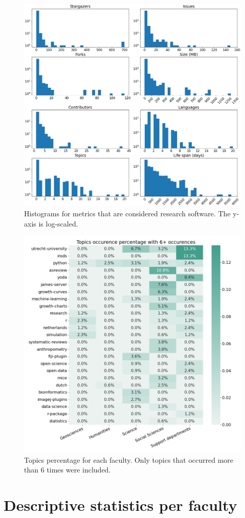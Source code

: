 \begin{figure}[h!]
\centerline{
\includegraphics[scale=0.5]{figures_results/extra/stats_histograms_rs_only.png}}
\caption{Histograms for metrics that are considered research software. The y-axis is log-scaled.
\label{fig:stats_histograms_rs_only}}
\end{figure}


\begin{figure}[h!]
\centerline{
\includegraphics[scale=0.6]{figures_results/extra/heatmap_topics_percentage.png}}
\caption{Topics percentage for each faculty. Only topics that occurred more than 6 times were included.
\label{fig:heatmap_topics_percentage}}
\end{figure}


\chapter{Descriptive statistics per faculty}
\label{app:stats_faculty}





